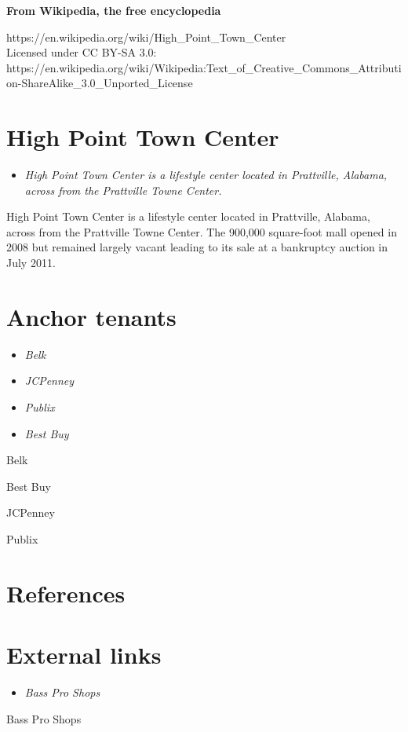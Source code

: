 \textbf{From Wikipedia, the free encyclopedia}

https://en.wikipedia.org/wiki/High\_Point\_Town\_Center\\
Licensed under CC BY-SA 3.0:\\
https://en.wikipedia.org/wiki/Wikipedia:Text\_of\_Creative\_Commons\_Attribution-ShareAlike\_3.0\_Unported\_License

\section{High Point Town Center}\label{high-point-town-center}

\begin{itemize}
\item
  \emph{High Point Town Center is a lifestyle center located in
  Prattville, Alabama, across from the Prattville Towne Center.}
\end{itemize}

High Point Town Center is a lifestyle center located in Prattville,
Alabama, across from the Prattville Towne Center. The 900,000
square-foot mall opened in 2008 but remained largely vacant leading to
its sale at a bankruptcy auction in July 2011.

\section{Anchor tenants}\label{anchor-tenants}

\begin{itemize}
\item
  \emph{Belk}
\item
  \emph{JCPenney}
\item
  \emph{Publix}
\item
  \emph{Best Buy}
\end{itemize}

Belk

Best Buy

JCPenney

Publix

\section{References}\label{references}

\section{External links}\label{external-links}

\begin{itemize}
\item
  \emph{Bass Pro Shops}
\end{itemize}

Bass Pro Shops
